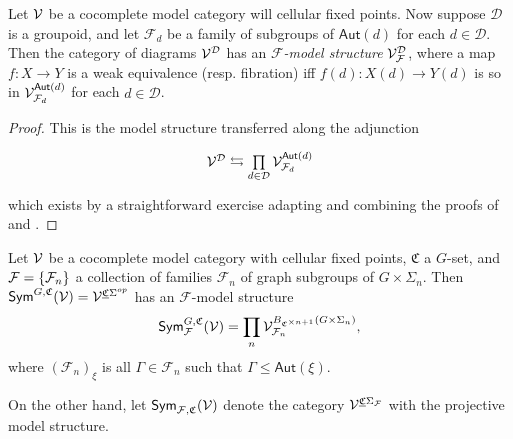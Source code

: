 \documentclass[a4paper,10pt
]{article}%
\newcommand{\UC}{\underline{\mathfrak C}}
\renewcommand{\F}{\mathcal F}
\renewcommand{\1}{\ensuremath{\mathbb{id}}}
\begin{document}
\begin{proposition}
      Let $\mathcal V$ be a cocomplete model category will cellular fixed points.
      Now suppose $\mathcal D$ is a groupoid, and let $\F_d$ be a family of subgroups of $\mathsf{Aut}(d)$ for each $d \in \mathcal D$.
      Then the category of diagrams $\mathcal V^{\mathcal D}$ has an \textit{$\F$-model structure} $\V^\D_\F$, where
      a map $f: X \to Y$ is a
      weak equivalence (resp. fibration) iff $f(d): X(d) \to Y(d)$ is so in $\V^{\mathsf{Aut}(d)}_{\F_d}$ for each $d \in \mathcal D$.
\end{proposition}
\begin{proof}
      This is the model structure transferred along the adjunction
      \begin{equation}
            \begin{tikzcd}
                  \V^\D \leftrightarrows
                  \mathop{\prod}\limits_{d \in \D}\V^{\mathsf{Aut}(d)}_{\F_d}
            \end{tikzcd}
      \end{equation}
      which exists by a straightforward exercise adapting and combining the proofs of
      \cite[Thm 11.6.1]{Hir03} and \cite[Prop 2.6]{Ste16}.
\end{proof}

\begin{example}
      Let $\mathcal V$ be a cocomplete model category with cellular fixed points,
      $\mathfrak C$ a $G$-set, and $\F = \set{\F_n}$ a collection of families $\F_n$ of graph subgroups of $G \times \Sigma_n$.
      Then $\Sym^{G,\mathfrak C}(\V) = \V^{\UC\Sigma^{op}}$ has an $\F$-model structure
      \begin{equation}
            \Sym^{G,\mathfrak C}_\F(\V) = \prod_n \V^{B_{\mathfrak C^{\times n+1}}(G \times \Sigma_n)}_{\F_n},
      \end{equation}
      where
      $(\F_n)_{\xi}$ is all $\Gamma \in \F_n$ such that $\Gamma \leq \mathsf{Aut}(\xi)$.
\end{example}

On the other hand, let $\Sym_{\F, \mathfrak C}(\V)$ denote the category $\V^{\UC\Sigma_\F}$ with the projective model structure.
\end{document}
